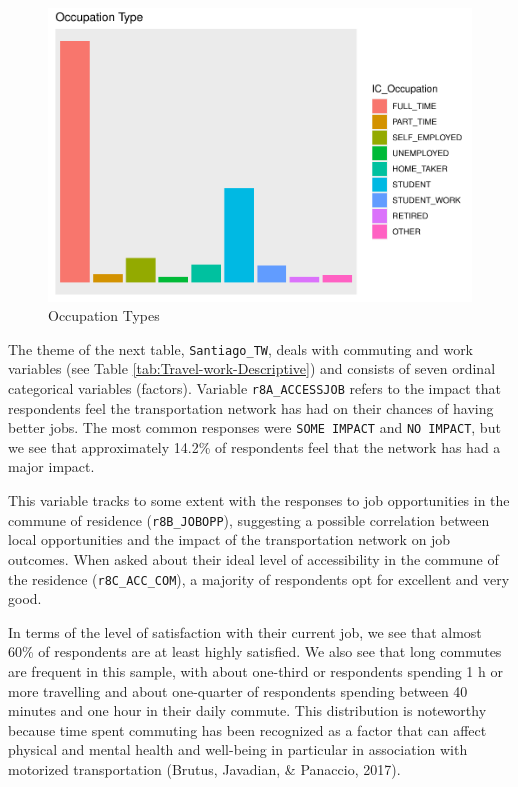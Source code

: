 \documentclass[
11pt, %
oneside, %
english, %
singlespacing, %
]{macthesis} %
\begin{document}
\begin{figure}

{\centering \includegraphics[width=0.85\linewidth]{thesis_files/figure-latex/unnamed-chunk-9-1} 

}

\caption{\label{fig:Occupation type graph}Occupation Types}\label{fig:unnamed-chunk-9}
\end{figure}
The theme of the next table, \texttt{Santiago\_TW}, deals with commuting and work variables (see Table \ref{tab:Travel-work-Descriptive}) and consists of seven ordinal categorical variables (factors). Variable \texttt{r8A\_ACCESSJOB} refers to the impact that respondents feel the transportation network has had on their chances of having better jobs. The most common responses were \texttt{SOME\ IMPACT} and \texttt{NO\ IMPACT}, but we see that approximately 14.2\% of respondents feel that the network has had a major impact.

This variable tracks to some extent with the responses to job opportunities in the commune of residence (\texttt{r8B\_JOBOPP}), suggesting a possible correlation between local opportunities and the impact of the transportation network on job outcomes. When asked about their ideal level of accessibility in the commune of the residence (\texttt{r8C\_ACC\_COM}), a majority of respondents opt for excellent and very good.

In terms of the level of satisfaction with their current job, we see that almost 60\% of respondents are at least highly satisfied. We also see that long commutes are frequent in this sample, with about one-third or respondents spending 1 h or more travelling and about one-quarter of respondents spending between 40 minutes and one hour in their daily commute. This distribution is noteworthy because time spent commuting has been recognized as a factor that can affect physical and mental health and well-being in particular in association with motorized transportation (Brutus, Javadian, \& Panaccio, 2017).
\end{document}
